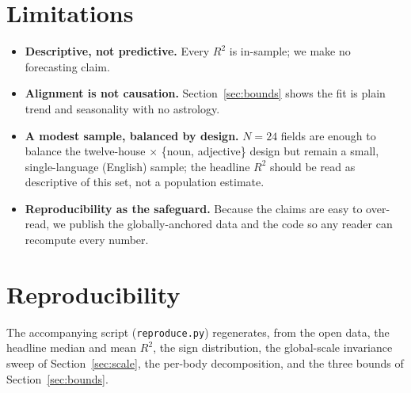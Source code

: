 \documentclass[11pt]{artaquest}
\newcommand{\headlineN}{24}            %
\begin{document}
\section{Limitations}
\begin{itemize}
  \item \textbf{Descriptive, not predictive.} Every $R^2$ is in-sample; we make no forecasting claim.
  \item \textbf{Alignment is not causation.} Section~\ref{sec:bounds} shows the fit is plain trend and
        seasonality with no astrology.
  \item \textbf{A modest sample, balanced by design.} $N=\headlineN{}$ fields are enough to balance the
        twelve-house $\times$ \{noun, adjective\} design but remain a small, single-language (English)
        sample; the headline $R^2$ should be read as descriptive of this set, not a population estimate.
  \item \textbf{Reproducibility as the safeguard.} Because the claims are easy to over-read, we publish
        the globally-anchored data and the code so any reader can recompute every number.
\end{itemize}

\section*{Reproducibility}
The accompanying script (\texttt{reproduce.py}) regenerates, from the open data, the headline median and
mean $R^2$, the sign distribution, the global-scale invariance sweep of Section~\ref{sec:scale}, the
per-body decomposition, and the three bounds of Section~\ref{sec:bounds}.

\declarations
{}


\end{document}
